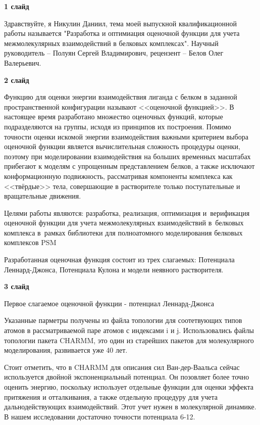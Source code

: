 \documentclass[17pt]{extarticle}
\begin{document}
\textbf{1 слайд}

Здравствуйте, я Никулин Даниил, тема моей выпускной квалификационной работы называется "Разработка и оптимиация оценочной функции для учета межмолекулярных взаимодействий в белковых комплексах". Научный руководитель -- Полуян Сергей Владимирович, рецензент -- Белов Олег Валерьевич.

\vspace{+5mm}


\textbf{2 слайд}

Функцию для оценки энергии взаимодействия лиганда с белком в заданной пространственной конфигурации называют <<оценочной функцией>>. В настоящее время разработано множество оценочных функций, которые подразделяются на группы, исходя из принципов их построения. Помимо точности оценки искомой энергии взаимодействия важными критерием выбора оценочной функции является вычислительная сложность процедуры оценки, поэтому при моделировании взаимодействия на больших временных масштабах прибегают к моделям с упрощенным представлением белков, а также исключают конформационную подвижность, рассматривая компоненты комплекса как <<твёрдые>> тела, совершающие в растворителе только поступательные и вращательные движения.

Целями работы являются: разработка, реализация, оптимизация и~верификация оценочной функции для учета межмолекулярных взаимодействий в~белковых комплекса в~рамках библиотеки для полноатомного моделирования белковых комплексов PSM

Разработанная оценочная функция состоит из трех слагаемых: Потенциала Леннард-Джонса, Потенциала Кулона и модели неявного растворителя.

\vspace{+5mm}


\textbf{3 слайд}

Первое слагаемое оценочной функции - потенциал Леннард-Джонса

Указанные парметры получены из файла топологии для соотетвующих типов атомов в рассматриваемой паре атомов с индексами i и j. Использовались файлы топологии пакета CHARMM, это один из старейших пакетов для молекулярного моделирования, развивается уже 40 лет.

Стоит отметить, что в CHARMM для описания сил Ван-дер-Ваальса сейчас используется двойной экспоненциальный потенциал. Он позовляет более точно оценить энергию, поскольку использует отдельные функции для оценки эффекта притяжения и отталкивания, а также отдельную процедуру для учета дальнодействующих взаимодействий. Этот учет нужен в молекулярной динамике. В нашем исследовании достаточно точности потенциала 6-12.
\end{document}
